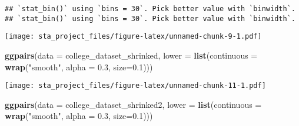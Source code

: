 \documentclass[
]{article}
\newenvironment{Shaded}{\begin{snugshade}}{\end{snugshade}}
\newcommand{\DataTypeTok}[1]{\textcolor[rgb]{0.13,0.29,0.53}{#1}}
\newcommand{\FloatTok}[1]{\textcolor[rgb]{0.00,0.00,0.81}{#1}}
\newcommand{\KeywordTok}[1]{\textcolor[rgb]{0.13,0.29,0.53}{\textbf{#1}}}
\newcommand{\NormalTok}[1]{#1}
\newcommand{\OperatorTok}[1]{\textcolor[rgb]{0.81,0.36,0.00}{\textbf{#1}}}
\newcommand{\StringTok}[1]{\textcolor[rgb]{0.31,0.60,0.02}{#1}}
\begin{document}
\begin{verbatim}
## `stat_bin()` using `bins = 30`. Pick better value with `binwidth`.
## `stat_bin()` using `bins = 30`. Pick better value with `binwidth`.
\end{verbatim}

\texttt{[image: sta\_project\_files/figure-latex/unnamed-chunk-9-1.pdf]}

\begin{Shaded}
\end{Shaded}

\begin{Shaded}
\begin{Highlighting}[]
\KeywordTok{ggpairs}\NormalTok{(}\DataTypeTok{data =}\NormalTok{ college_dataset_shrinked, }\DataTypeTok{lower =} \KeywordTok{list}\NormalTok{(}\DataTypeTok{continuous =} \KeywordTok{wrap}\NormalTok{(}\StringTok{"smooth"}\NormalTok{, }\DataTypeTok{alpha =} \FloatTok{0.3}\NormalTok{, }\DataTypeTok{size=}\FloatTok{0.1}\NormalTok{)))}
\end{Highlighting}
\end{Shaded}

\texttt{[image: sta\_project\_files/figure-latex/unnamed-chunk-11-1.pdf]}

\begin{Shaded}
\begin{Highlighting}[]
\KeywordTok{ggpairs}\NormalTok{(}\DataTypeTok{data =}\NormalTok{ college_dataset_shrinked2, }\DataTypeTok{lower =} \KeywordTok{list}\NormalTok{(}\DataTypeTok{continuous =} \KeywordTok{wrap}\NormalTok{(}\StringTok{"smooth"}\NormalTok{, }\DataTypeTok{alpha =} \FloatTok{0.3}\NormalTok{, }\DataTypeTok{size=}\FloatTok{0.1}\NormalTok{)))}
\end{Highlighting}
\end{Shaded}
\end{document}

